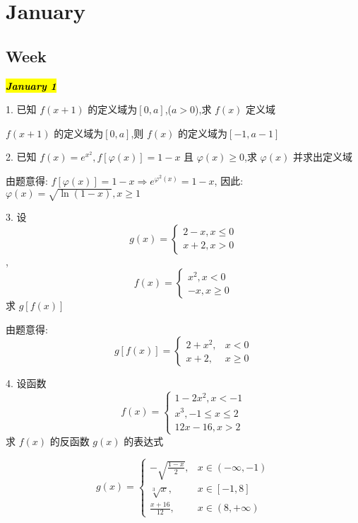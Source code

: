 \chapter{January}
\section{Week }

\hl{\textbf{\textit{January 1}}}

1. 已知 $f(x+1)$ 的定义域为$[0,a]$,($a>0$),求 $f(x)$ 定义域
\begin{solution}
	
	$f(x+1)$ 的定义域为$[0,a]$,则 $f(x)$ 的定义域为$[-1,a-1]$
\end{solution}

2. 已知 $f(x)=e^{x^{2}},f[\varphi(x)]=1-x$ 且 $\varphi(x)\geq 0$,求 $\varphi(x)$ 并求出定义域
\begin{solution}
	
	由题意得: $f[\varphi(x)]=1-x\Rightarrow e^{\varphi^{2}(x)}=1-x$, 因此: $\varphi(x)=\sqrt{\ln (1-x)}, x\ge 1$
\end{solution}

3. 设 
	$$g(x)=
	\begin{cases}
		2-x,x\leq 0\\ x+2,x>0
	\end{cases}$$,$$f(x)=
	\begin{cases}
		x^{2},x< 0\\ -x,x\geq 0
	\end{cases}
	$$
求 $g[f(x)]$
\begin{solution}

	由题意得:
	$$
	g[f(x)] = 
	\begin{cases}
		2+x^{2}, & x<0\\
		x+2, & x\geq 0
	\end{cases}
	$$
\end{solution}

4. 设函数 $$f(x)=
\begin{cases}
	1-2x^{2},x<-1\\
	x^{3},-1\leq x\leq 2\\
	12x-16,x>2
\end{cases}
$$
求 $f(x)$ 的反函数 $g(x)$ 的表达式
\begin{solution}
	$$
	g(x) = 
	\begin{cases}
		-\sqrt{\frac{1-x}{2}}, & x\in(-\infty,-1)\\
		\sqrt[3]{x}, & x\in[-1,8]\\
		\frac{x+16}{12}, & x\in(8,+\infty)
	\end{cases}
	$$
\end{solution}

